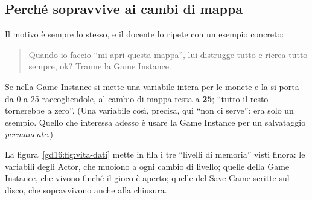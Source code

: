 \subsection{Perché sopravvive ai cambi di mappa}

Il motivo è sempre lo stesso, e il docente lo ripete con un esempio
concreto:
\begin{quote}
Quando io faccio ``mi apri questa mappa'', lui distrugge tutto e ricrea tutto
sempre, ok? Tranne la Game Instance.
\end{quote}
Se nella Game Instance si mette una variabile intera per le monete e la si
porta da 0 a 25 raccogliendole, al cambio di mappa resta a \textbf{25}; ``tutto
il resto tornerebbe a zero''. (Una variabile così, precisa, qui ``non ci serve'':
era solo un esempio. Quello che interessa adesso è usare la Game Instance per un
salvataggio \emph{permanente}.)

La figura~\ref{gd16:fig:vita-dati} mette in fila i tre ``livelli di memoria''
visti finora: le variabili degli Actor, che muoiono a ogni cambio di livello;
quelle della Game Instance, che vivono finché il gioco è aperto; quelle del
Save Game scritte sul disco, che sopravvivono anche alla chiusura.


